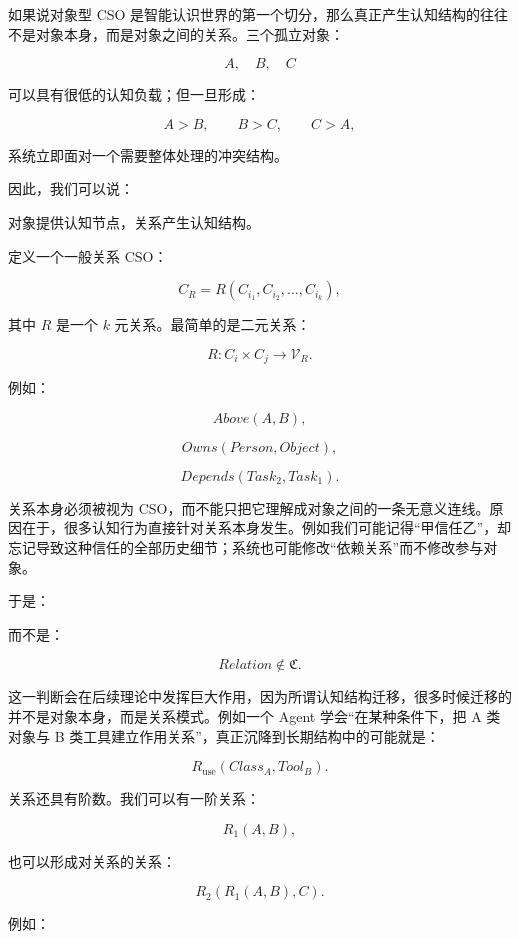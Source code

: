 如果说对象型 CSO 是智能认识世界的第一个切分，那么真正产生认知结构的往往不是对象本身，而是对象之间的关系。三个孤立对象：

\[
A,\quad B,\quad C
\]

可以具有很低的认知负载；但一旦形成：

\[
A>B,
\qquad
B>C,
\qquad
C>A,
\]

系统立即面对一个需要整体处理的冲突结构。

因此，我们可以说：

\begin{statementbox}
对象提供认知节点，关系产生认知结构。
\end{statementbox}

定义一个一般关系 CSO：

\[
C_R
=
R(C_{i_1},C_{i_2},\ldots,C_{i_k}),
\]

其中 \(R\) 是一个 \(k\) 元关系。最简单的是二元关系：

\[
R:C_i\times C_j\rightarrow \mathcal V_R.
\]

例如：

\[
Above(A,B),
\]

\[
Owns(Person,Object),
\]

\[
Depends(Task_2,Task_1).
\]

关系本身必须被视为 CSO，而不能只把它理解成对象之间的一条无意义连线。原因在于，很多认知行为直接针对关系本身发生。例如我们可能记得“甲信任乙”，却忘记导致这种信任的全部历史细节；系统也可能修改“依赖关系”而不修改参与对象。

于是：

\begin{statementbox}
\centering
{}
\end{statementbox}

而不是：

\[
Relation
\notin
\mathfrak C.
\]

这一判断会在后续理论中发挥巨大作用，因为所谓认知结构迁移，很多时候迁移的并不是对象本身，而是关系模式。例如一个 Agent 学会“在某种条件下，把 A 类对象与 B 类工具建立作用关系”，真正沉降到长期结构中的可能就是：

\[
R_{\mathrm{use}}
(
Class_A,
Tool_B
).
\]

关系还具有阶数。我们可以有一阶关系：

\[
R_1(A,B),
\]

也可以形成对关系的关系：

\[
R_2
\left(
R_1(A,B),
C
\right).
\]

例如：

